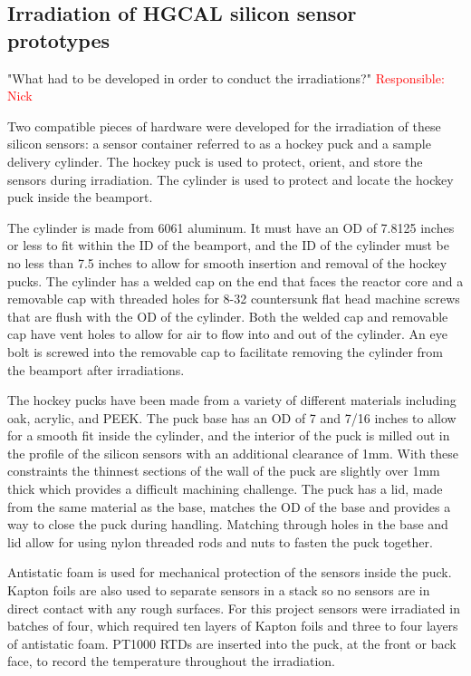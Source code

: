 \subsection{Irradiation of HGCAL silicon sensor prototypes}
\label{subsec:irradiation}
"What had to be developed in order to conduct the irradiations?" \textcolor{red}{Responsible: Nick}

Two compatible pieces of hardware were developed for the irradiation of these silicon sensors: a sensor container referred to as a hockey puck and a sample delivery cylinder. 
The hockey puck is used to protect, orient, and store the sensors during irradiation. 
The cylinder is used to protect and locate the hockey puck inside the beamport.

The cylinder is made from 6061 aluminum. 
It must have an OD of 7.8125 inches or less to fit within the ID of the beamport, and the ID of the cylinder must be no less than 7.5 inches to allow for smooth insertion and removal of the hockey pucks.
The cylinder has a welded cap on the end that faces the reactor core and a removable cap with threaded holes for 8-32 countersunk flat head machine screws that are flush with the OD of the cylinder. 
Both the welded cap and removable cap have vent holes to allow for air to flow into and out of the cylinder.
An eye bolt is screwed into the removable cap to facilitate removing the cylinder from the beamport after irradiations.

The hockey pucks have been made from a variety of different materials including oak, acrylic, and PEEK. 
The puck base has an OD of 7 and 7/16 inches to allow for a smooth fit inside the cylinder, and the interior of the puck is milled out in the profile of the silicon sensors with an additional clearance of 1mm. 
With these constraints the thinnest sections of the wall of the puck are slightly over 1mm thick which provides a difficult machining challenge.
The puck has a lid, made from the same material as the base, matches the OD of the base and provides a way to close the puck during handling.
Matching through holes in the base and lid allow for using nylon threaded rods and nuts to fasten the puck together. 

Antistatic foam is used for mechanical protection of the sensors inside the puck.
Kapton foils are also used to separate sensors in a stack so no sensors are in direct contact with any rough surfaces.
For this project sensors were irradiated in batches of four, which required ten layers of Kapton foils and three to four layers of antistatic foam. 
PT1000 RTDs are inserted into the puck, at the front or back face, to record the temperature throughout the irradiation.

